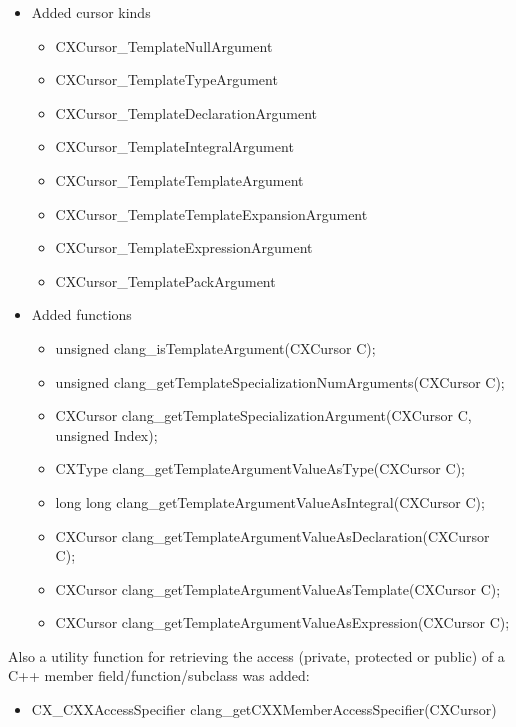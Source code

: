 \begin{itemize}\addtolength{\itemsep}{-0.5\baselineskip}
\item Added cursor kinds\begin{itemize}\addtolength{\itemsep}{-0.5\baselineskip}
	\item CXCursor\_TemplateNullArgument
	\item CXCursor\_TemplateTypeArgument
	\item CXCursor\_TemplateDeclarationArgument
	\item CXCursor\_TemplateIntegralArgument
	\item CXCursor\_TemplateTemplateArgument
	\item CXCursor\_TemplateTemplateExpansionArgument
	\item CXCursor\_TemplateExpressionArgument
	\item CXCursor\_TemplatePackArgument
	\end{itemize}
\item Added functions\begin{itemize}\addtolength{\itemsep}{-0.5\baselineskip}
	\item unsigned clang\_isTemplateArgument(CXCursor C);
	\item unsigned clang\_getTemplateSpecializationNumArguments(CXCursor C);
	\item CXCursor clang\_getTemplateSpecializationArgument(CXCursor C, unsigned Index);
	\item CXType clang\_getTemplateArgumentValueAsType(CXCursor C);
	\item long long clang\_getTemplateArgumentValueAsIntegral(CXCursor C);
	\item CXCursor clang\_getTemplateArgumentValueAsDeclaration(CXCursor C);
	\item CXCursor clang\_getTemplateArgumentValueAsTemplate(CXCursor C);
	\item CXCursor clang\_getTemplateArgumentValueAsExpression(CXCursor C);
	\end{itemize}
\end{itemize}

Also a utility function for retrieving the access (private, protected or public) of a C++ member field/function/subclass was added:
\begin{itemize}\addtolength{\itemsep}{-0.5\baselineskip}
\item CX\_CXXAccessSpecifier clang\_getCXXMemberAccessSpecifier(CXCursor)
\end{itemize}

